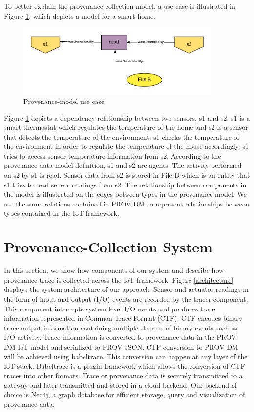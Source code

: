 To better explain the provenance-collection model, a use case is illustrated in Figure \ref{prov_model}, which depicts a model for a smart home.



\begin{figure}[h]
\begin{center}

\includegraphics[width=4.0in]{provenance_model.png}    
\end{center}
\caption{Provenance-model use case}
\label{prov_model}
\end{figure}



Figure \ref{prov_model}  depicts a dependency relationship between two sensors, s1 and s2. s1 is a smart thermostat which regulates the temperature of the home and s2 is a sensor that detects the temperature of the environment. s1 checks the temperature of the environment in order to regulate the temperature of the house accordingly. s1 tries to access sensor temperature information from s2. According to the provenance data model  definition, s1 and s2 are agents. The activity performed on s2 by s1 is read. Sensor data from s2 is stored in File B which is  an entity that s1 tries to read sensor readings from s2. The relationship between components in the model is illustrated on the edges between types in the provenance model. We use the same relations contained in PROV-DM to represent relationships between types contained in the IoT framework.




\section{Provenance-Collection System}

In this section, we show how components of our system and describe how provenance trace is collected across the IoT framework. Figure \ref{architecture} displays the system architecture of our approach. Sensor and actuator readings in the form of input and output (I/O) events are recorded by the tracer component. This component intercepts system level I/O events and produces trace information represented in Common Trace Format (CTF). CTF encodes binary trace output information containing multiple streams of binary events such as I/O activity. Trace information is converted to provenance data in the PROV-DM IoT model and serialized to PROV-JSON. CTF conversion to PROV-DM will be achieved using babeltrace. This conversion can happen at any layer of the IoT stack.  Babeltrace is a plugin framework which allows the conversion of CTF traces into other formats. Trace or provenance data is securely transmitted to a gateway and later transmitted and stored in a cloud backend. Our backend of choice is Neo4j, a graph database for efficient storage, query and visualization of provenance data.


